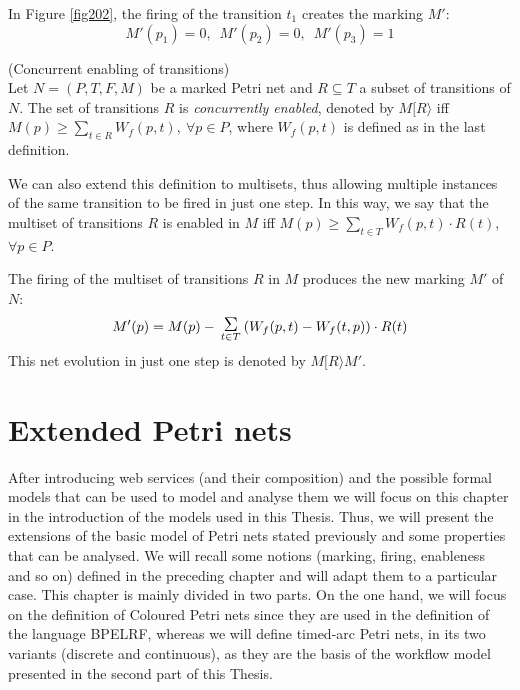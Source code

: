 \begin{example} In Figure \ref{fig202}, the firing of the transition $t_1$
creates the marking $M'$:
\[ M'(p_1) = 0,\,\,\,M'(p_2)=0,\,\,\,M'(p_3)=1 \]
\end{example}

\begin{definition} (Concurrent enabling of transitions)\\
Let $N= (P,T,F,M)$ be a marked Petri net and $R \subseteq T$ a subset of transitions of $N$.
The set of transitions $R$ is \emph{concurrently enabled}, denoted by $M [ R \rangle$
iff $M(p) \geq \sum_{t \in R} W_f(p,t),~
\forall p\in P$, where
$W_f(p,t)$ is defined as in the last definition.

We can also extend this definition to multisets, thus allowing
multiple instances of the same transition to be fired in just one step.
In this way, we say that the multiset of transitions $R$ 
is enabled in $M$ iff $M(p)
\geq \sum_{t \in T} W_f(p,t) \cdot R(t)$, $\forall p \in P$.

The firing of the multiset of transitions $R$ in $M$ 
produces the new marking $M'$ of $N$:
\[ M'(p) = M(p) - \sumas{t \in T} (W_f(p,t) - W_f(t,p)) \cdot R(t)\]
This net evolution in just one step is denoted by
$M[ R \rangle M'$.
\end{definition}
\chapter{Extended Petri nets}\label{chapter:extended}
After introducing web services (and their composition) and the possible formal models
that can be used to model and analyse them
we will focus on this chapter in the introduction of the models used in this Thesis. Thus, we
will present the extensions of the basic model of Petri nets stated previously and some properties
that can be analysed. We will recall some notions (marking, firing, enableness and so on) defined in the preceding chapter
and will adapt them to a particular case. This chapter is mainly divided in two parts. On the one hand,
we will focus on the definition of Coloured Petri nets since they are used in the definition of the language BPELRF, whereas
we will define timed-arc Petri nets, in its two variants (discrete and continuous), as they are the basis of the workflow model presented in the
second part of this Thesis.

